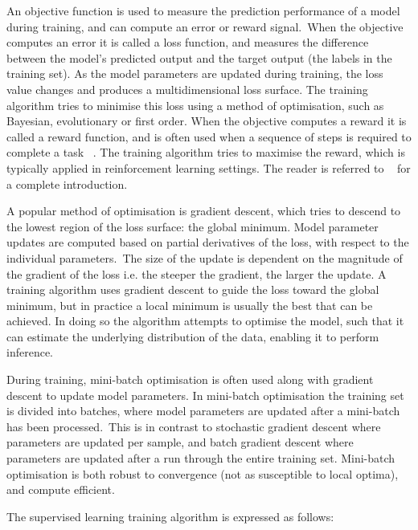\noindent An objective function is used to measure the prediction performance of a model during training, and can compute an error or reward signal.\ When the objective computes an error it is called a loss function, and measures the difference between the model's predicted output and the target output (the labels in the training set). As the model parameters are updated during training, the loss value changes and produces a multidimensional loss surface. The training algorithm tries to minimise this loss using a method of optimisation, such as Bayesian, evolutionary or first order. When the objective computes a reward it is called a reward function, and is often used when a sequence of steps is required to complete a task \unskip ~\citep{murphy2012machine}. The training algorithm tries to maximise the reward, which is typically applied in reinforcement learning settings. The reader is referred to \unskip~\citep {sutton2018reinforcement} for a complete introduction. \par

\noindent A popular method of optimisation is gradient descent, which tries to descend to the lowest region of the loss surface: the global minimum. Model parameter updates are computed based on partial derivatives of the loss, with respect to the individual parameters.\ The size of the update is dependent on the magnitude of the gradient of the loss i.e. the steeper the gradient, the larger the update. A training algorithm uses gradient descent to guide the loss toward the global minimum, but in practice a local minimum is usually the best that can be achieved. In doing so the algorithm attempts to optimise the model, such that it can estimate the underlying distribution of the data, enabling it to perform inference. \par

\noindent During training, mini-batch optimisation is often used along with gradient descent to update model parameters. In mini-batch optimisation the training set is divided into batches, where model parameters are updated after a mini-batch has been processed.\ This is in contrast to stochastic gradient descent where parameters are updated per sample, and batch gradient descent where parameters are updated after a run through the entire training set. Mini-batch optimisation is both robust to convergence (not as susceptible to local optima), and compute efficient. \par

\noindent The supervised learning training algorithm is expressed as follows: \par 

